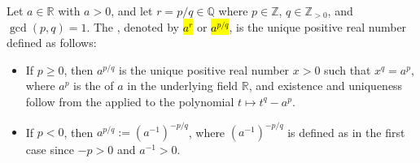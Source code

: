 \begin{definition} \label{definition:exponentiation_of_positive_real_numbers_by_rational_exponents}
    Let $a \in \mathbb{R}$ with $a > 0$, and let $r = p/q \in \mathbb{Q}$ where $p \in \mathbb{Z}$, $q \in \mathbb{Z}_{> 0}$, and $\gcd(p,q) = 1$. The , denoted by \hl{$a^r$} or \hl{$a^{p/q}$}, is the unique positive real number defined as follows:
    \begin{itemize}
        \item If $p \geq 0$, then $a^{p/q}$ is the unique positive real number $x > 0$ such that $x^q = a^p$, where $a^p$ is the  of $a$ in the underlying field $\mathbb{R}$, and existence and uniqueness follow from the  applied to the polynomial $t \mapsto t^q - a^p$.
        \item If $p < 0$, then $a^{p/q} := (a^{-1})^{-p/q}$, where $(a^{-1})^{-p/q}$ is defined as in the first case since $-p > 0$ and $a^{-1} > 0$.
    \end{itemize}
\end{definition}
